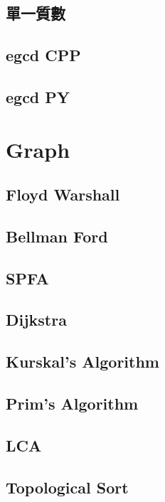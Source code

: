    \subsection{單一質數}
        
    \subsection{egcd CPP}
        
    \subsection{egcd PY}
        

\section{Graph}
    \subsection{Floyd Warshall}
        
    \subsection{Bellman Ford}
        
    \subsection{SPFA}
        
    \subsection{Dijkstra}
        
    \subsection{Kurskal's Algorithm}
        
    \subsection{Prim's Algorithm}
        
    \subsection{LCA}
        
    \subsection{Topological Sort}
        